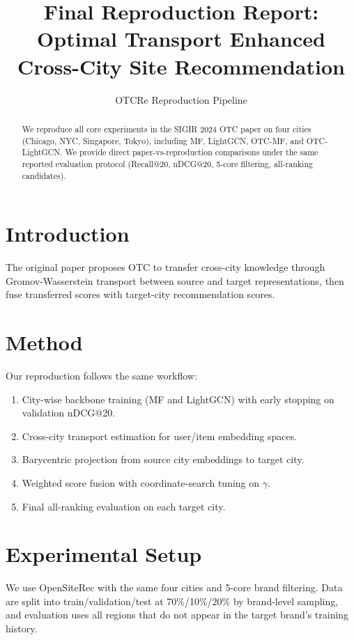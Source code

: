 \documentclass[10pt]{article}
\title{Final Reproduction Report: Optimal Transport Enhanced Cross-City Site Recommendation}
\author{OTCRe Reproduction Pipeline}
\date{}
\begin{document}
\maketitle

\begin{abstract}
We reproduce all core experiments in the SIGIR 2024 OTC paper on four cities (Chicago, NYC, Singapore, Tokyo), including MF, LightGCN, OTC-MF, and OTC-LightGCN. We provide direct paper-vs-reproduction comparisons under the same reported evaluation protocol (Recall@20, nDCG@20, 5-core filtering, all-ranking candidates).
\end{abstract}

\section{Introduction}
The original paper proposes OTC to transfer cross-city knowledge through Gromov-Wasserstein transport between source and target representations, then fuse transferred scores with target-city recommendation scores.

\section{Method}
Our reproduction follows the same workflow:
\begin{enumerate}
\item City-wise backbone training (MF and LightGCN) with early stopping on validation nDCG@20.
\item Cross-city transport estimation for user/item embedding spaces.
\item Barycentric projection from source city embeddings to target city.
\item Weighted score fusion with coordinate-search tuning on $\gamma$.
\item Final all-ranking evaluation on each target city.
\end{enumerate}

\section{Experimental Setup}
We use OpenSiteRec with the same four cities and 5-core brand filtering. Data are split into train/validation/test at 70\%/10\%/20\% by brand-level sampling, and evaluation uses all regions that do not appear in the target brand's training history.
\end{document}
